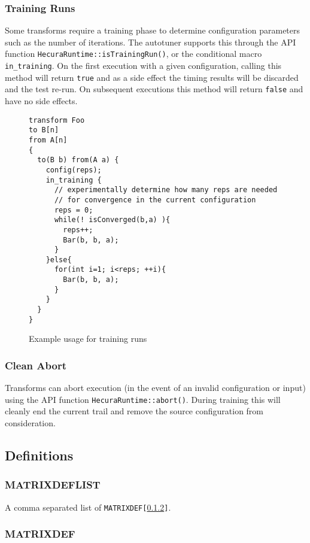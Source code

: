 \documentclass[11pt]{article}
\begin{document}
\subsubsection{Training Runs}


Some transforms require a training phase to determine configuration parameters
such as the number of iterations.  The autotuner supports this through the
API function {\tt HecuraRuntime::isTrainingRun()}, or the conditional macro
{\tt in\_training}.  On the first execution with a given configuration,
calling this method will return {\tt true} and as a side effect the timing
results will be discarded and the test re-run.  On subsequent executions
this method will return {\tt false} and have no side effects.

\begin{figure}[h]
\begin{lstlisting}
transform Foo
to B[n]
from A[n]
{
  to(B b) from(A a) {
    config(reps);
    in_training {
      // experimentally determine how many reps are needed
      // for convergence in the current configuration
      reps = 0;
      while(! isConverged(b,a) ){
        reps++;
        Bar(b, b, a);
      }
    }else{
      for(int i=1; i<reps; ++i){
        Bar(b, b, a);
      }
    }
  }
}
\end{lstlisting}
\caption{
Example usage for training runs
\label{ex6}
}
\end{figure}

\subsubsection{Clean Abort}

Transforms can abort execution (in the event of an invalid configuration or
input) using the API function {\tt HecuraRuntime::abort()}.  During training
this will cleanly end the current trail and remove the source configuration
from consideration.

\subsection{Definitions}
\subsubsection{MATRIXDEFLIST}
\label{MATRIXDEFLIST}
 
A comma separated list of {\tt MATRIXDEF[\ref{MATRIXDEF}]}.

\subsubsection{MATRIXDEF}
\label{MATRIXDEF}
\end{document}
